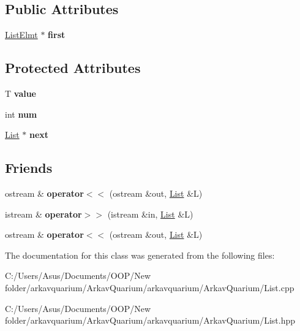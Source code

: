 \subsection*{Public Attributes}
\begin{DoxyCompactItemize}
\item 
\mbox{\label{class_list_a2bb760765b228099a24741eb8c286bcb}} 
\mbox{\hyperlink{class_list_1_1_list_elmt}{List\+Elmt}} $\ast$ {\bfseries first}
\end{DoxyCompactItemize}
\subsection*{Protected Attributes}
\begin{DoxyCompactItemize}
\item 
\mbox{\label{class_list_a9d5d9c4ec56d10e1f756de27d4e72dd9}} 
T {\bfseries value}
\item 
\mbox{\label{class_list_a8d9eb1ce93f0c564bf7b1099014f9887}} 
int {\bfseries num}
\item 
\mbox{\label{class_list_a141a9cba941ab2d7a922d90356648fcf}} 
\mbox{\hyperlink{class_list}{List}} $\ast$ {\bfseries next}
\end{DoxyCompactItemize}
\subsection*{Friends}
\begin{DoxyCompactItemize}
\item 
\mbox{\label{class_list_a4d459cc571f6d70ac4f85ca6eebea471}} 
ostream \& {\bfseries operator$<$$<$} (ostream \&out, \mbox{\hyperlink{class_list}{List}} \&L)
\item 
\mbox{\label{class_list_a0c8949f7ee7e923600d0fe050ea74975}} 
istream \& {\bfseries operator$>$$>$} (istream \&in, \mbox{\hyperlink{class_list}{List}} \&L)
\item 
\mbox{\label{class_list_a4d459cc571f6d70ac4f85ca6eebea471}} 
ostream \& {\bfseries operator$<$$<$} (ostream \&out, \mbox{\hyperlink{class_list}{List}} \&L)
\end{DoxyCompactItemize}


The documentation for this class was generated from the following files\+:\begin{DoxyCompactItemize}
\item 
C\+:/\+Users/\+Asus/\+Documents/\+O\+O\+P/\+New folder/arkavquarium/\+Arkav\+Quarium/arkavquarium/\+Arkav\+Quarium/List.\+cpp\item 
C\+:/\+Users/\+Asus/\+Documents/\+O\+O\+P/\+New folder/arkavquarium/\+Arkav\+Quarium/arkavquarium/\+Arkav\+Quarium/List.\+hpp\end{DoxyCompactItemize}
